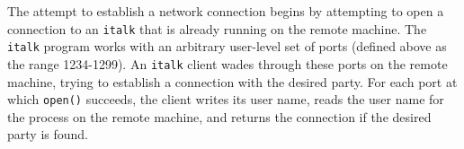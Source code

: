 
The attempt to establish a network connection begins by attempting to
open a connection to an \texttt{italk} that is already running on the
remote machine. The \texttt{italk} program works with an arbitrary
user-level set of ports (defined above as the range 1234-1299). An
\texttt{italk} client wades through these ports on the remote machine,
trying to establish a connection with the desired party. For each port
at which \texttt{open()} succeeds, the client writes its user name,
reads the user name for the process on the remote machine, and returns
the connection if the desired party is found.


